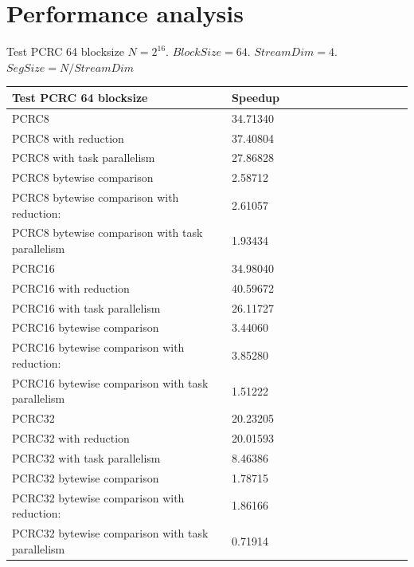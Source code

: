 \documentclass[10pt]{beamer}
\begin{document}
\section[Performance analysis]{Performance analysis}


\begin{frame}[fragile]{Test PCRC 64 blocksize}
$N=2^{16}$. $BlockSize=64$. $StreamDim=4$. $SegSize=N/StreamDim$
\begin{footnotesize}
\begin{tabular}{l|l|l|l|l|r|r|r|r|r|r||c|c|}
\toprule
\textbf{Test PCRC 64 blocksize} & \textbf{Speedup} \\
\midrule
PCRC8                                           &	34.71340 \\
PCRC8 with reduction                            &	37.40804 \\
PCRC8 with task parallelism                     &	27.86828 \\
PCRC8 bytewise comparison                       &	2.58712  \\
PCRC8 bytewise comparison with reduction:       &	2.61057  \\
PCRC8 bytewise comparison with task parallelism &	1.93434  \\
PCRC16                                           &	34.98040 \\
PCRC16 with reduction                            &	40.59672 \\
PCRC16 with task parallelism                     &	26.11727 \\
PCRC16 bytewise comparison                       &	3.44060  \\
PCRC16 bytewise comparison with reduction:       &	3.85280  \\
PCRC16 bytewise comparison with task parallelism &	1.51222  \\
PCRC32                                           &	20.23205 \\
PCRC32 with reduction                            &	20.01593 \\
PCRC32 with task parallelism                     &	8.46386  \\
PCRC32 bytewise comparison                       &	1.78715  \\
PCRC32 bytewise comparison with reduction:       &	1.86166  \\
PCRC32 bytewise comparison with task parallelism &	0.71914  \\
\bottomrule
\end{tabular}
\end{footnotesize}
\end{frame}
\end{document}
